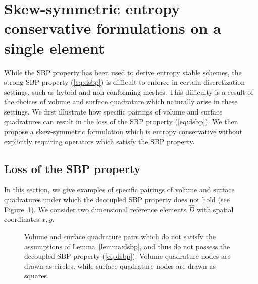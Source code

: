 \documentclass[review]{siamart0216}
\theoremstyle{assumption}
\renewcommand{\hat}[1]{\hat{#1}}
\renewcommand{\hat}{\widehat}
\begin{document}
\section{Skew-symmetric entropy conservative formulations on a single element}
\label{sec:skew1}
While the SBP property has been used to derive entropy stable schemes, the strong SBP property (\ref{eq:dsbp}) is difficult to enforce in certain discretization settings, such as hybrid and non-conforming meshes.  This difficulty is a result of the choices of volume and surface quadrature which naturally arise in these settings.  We first illustrate how specific pairings of volume and surface quadratures can result in the loss of the SBP property (\ref{eq:dsbp}).  We then propose a skew-symmetric formulation which is entropy conservative without explicitly requiring operators which satisfy the SBP property.  

\subsection{Loss of the SBP property}

In this section, we give examples of specific pairings of volume and surface quadratures under which the decoupled SBP property does not hold (see Figure~\ref{fig:sbploss}).  We consider two dimensional reference elements $\hat{D}$ with spatial coordinates $x,y$.
\begin{figure}
\centering
{}
\hspace{2em}
\caption{Volume and surface quadrature pairs which do not satisfy the assumptions of Lemma~\ref{lemma:dsbp}, and thus do not possess the decoupled SBP property (\ref{eq:dsbp}). Volume quadrature nodes are drawn as circles, while surface quadrature nodes are drawn as squares.}
\label{fig:sbploss}
\end{figure}
\end{document}
